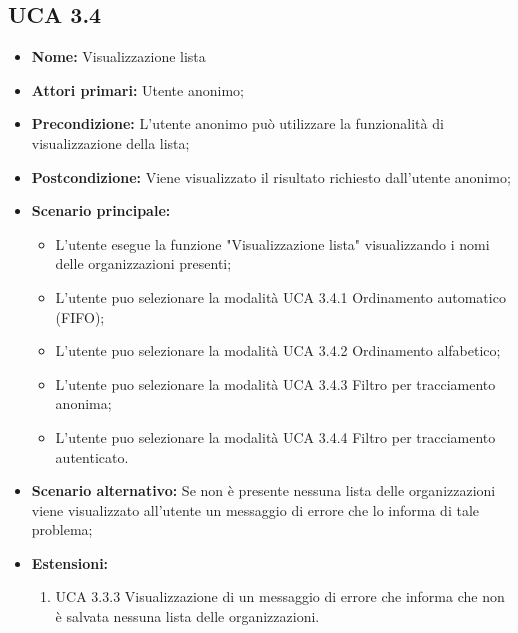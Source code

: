 \subsection{UCA 3.4}%
\begin{itemize}
	\item \textbf{Nome:} Visualizzazione lista 
	\item \textbf{Attori primari:} Utente anonimo;
	\item \textbf{Precondizione:} L’utente anonimo può utilizzare la funzionalità di visualizzazione della lista;
	\item \textbf{Postcondizione:} Viene visualizzato il risultato richiesto dall’utente anonimo;
	\item \textbf{Scenario principale:}	
	\begin{itemize}
		\item L’utente esegue la funzione "Visualizzazione lista" visualizzando i nomi delle organizzazioni presenti;
		\item L'utente puo selezionare la modalità UCA 3.4.1 Ordinamento automatico (FIFO);
		\item L'utente puo selezionare la modalità UCA 3.4.2 Ordinamento alfabetico;
		\item L'utente puo selezionare la modalità UCA 3.4.3 Filtro per tracciamento anonima;
		\item L'utente puo selezionare la modalità UCA 3.4.4 Filtro per tracciamento autenticato.
	\end{itemize}
	\item \textbf{Scenario alternativo:} Se non è presente nessuna lista delle organizzazioni viene visualizzato all’utente un messaggio di errore che lo informa di tale problema;
	\item \textbf{Estensioni:}
	\begin{enumerate}
		\item UCA 3.3.3 Visualizzazione di un messaggio di errore che informa che non è salvata nessuna lista delle organizzazioni.
	\end{enumerate}
\end{itemize}

